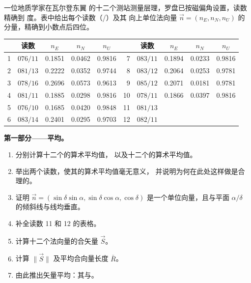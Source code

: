 \begin{problem}
\label{pb:b1:field-lab-methods-1:1}
一位地质学家在瓦尔登东翼
的十二个测站测量层理，罗盘已按磁偏角设置，读数精确到
度。表中给出每个读数（/）及其
向上单位法向量 $\vec n = (n_E, n_N, n_U)$ 的分量，精确到小数点后四位。
\begin{center}
\small
\begin{tabular}{rcccc@{\qquad}rcccc}
\hline
 & 读数 & $n_E$ & $n_N$ & $n_U$ & & 读数 & $n_E$ & $n_N$ & $n_U$ \\
\hline
1 & $076/11$ & 0.1851 & 0.0462 & 0.9816 & 7 & $083/11$ & 0.1894 & 0.0233 & 0.9816 \\
2 & $081/13$ & 0.2222 & 0.0352 & 0.9744 & 8 & $083/12$ & 0.2064 & 0.0253 & 0.9781 \\
3 & $078/16$ & 0.2696 & 0.0573 & 0.9613 & 9 & $085/12$ & 0.2071 & 0.0181 & 0.9781 \\
4 & $081/11$ & 0.1885 & 0.0298 & 0.9816 & 10 & $078/11$ & 0.1866 & 0.0397 & 0.9816 \\
5 & $076/10$ & 0.1685 & 0.0420 & 0.9848 & 11 & $081/13$ & & & \\
6 & $083/14$ & 0.2401 & 0.0295 & 0.9703 & 12 & $082/11$ & & & \\
\hline
\end{tabular}
\end{center}

\medskip
\noindent\textbf{第一部分——平均。}
\begin{enumerate}
  \item 分别计算十二个的算术平均值，
        以及十二个的算术平均值。
  \item 举出两个读数，使其的算术平均值毫无意义，
        并说明为何在此处这样做是合理的。
  \item 证明 $\vec n = (\sin\delta\sin\alpha, \sin\delta\cos\alpha,
        \cos\delta)$ 是一个单位向量，且与平面
        $\alpha/\delta$ 的倾斜线与线均垂直。
  \item 补全读数 11 和 12 的表格。
  \item 计算十二个法向量的合矢量 $\vec S$。
  \item 计算 $\|\vec S\|$ 及平均合向量长度 $\bar R$。
  \item 由此推出矢量平均：其与。
\end{enumerate}


\end{problem}
